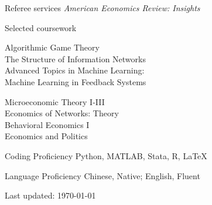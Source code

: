 \documentclass{resume} %
\begin{document}
\begin{rSection}{Referee services}
\emph{American Economics Review: Insights}
\end{rSection}


\begin{rSection}{Selected coursework}
\begin{minipage}[t]{0.5\textwidth}
Algorithmic Game Theory \\
The Structure of Information Networks \\
Advanced Topics in Machine Learning: \\
\-\hspace{1em} Machine Learning in Feedback Systems
\end{minipage}
\begin{minipage}[t]{0.5\textwidth}
Microeconomic Theory I-III\\
Economics of Networks: Theory\\
Behavioral Economics I \\
Economics and Politics
\end{minipage}


\end{rSection}



\begin{rSection}{Coding Proficiency}
Python, MATLAB, Stata, R, \LaTeX 

\end{rSection}


\begin{rSection}{Language Proficiency} 
Chinese, Native; English, Fluent

\end{rSection}

\bigskip 
\centering 
Last updated: \monthyeardate\today 
\end{document}
